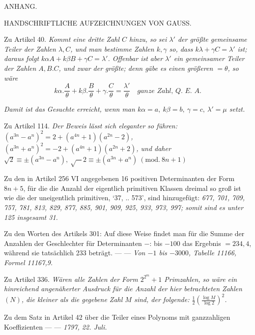
\begin{center}ANHANG.\end{center}

\begin{center}\small HANDSCHRIFTLICHE AUFZEICHNUNGEN VON GAUSS.\end{center}


Zu Artikel 40. \textit{Kommt eine dritte Zahl \(C\) hinzu, so sei \(\lambda'\) der größte gemeinsame Teiler der Zahlen \(\lambda,C\), und man bestimme Zahlen \(k,\gamma\) so, dass \(k\lambda+\gamma C=\lambda'\) ist; daraus folgt \(k\alpha A+k\beta B+\gamma C=\lambda'\). Offenbar ist aber \(\lambda'\) ein gemeinsamer Teiler der Zahlen \(A,B.C\), und zwar der größte; denn gäbe es einen größeren \(=\theta\), so wäre \[k\alpha.\frac{A}{\theta}+k\beta.\frac{B}{\theta}+\gamma.\frac{C}{\theta}=\frac{\lambda'}{\theta}\quad\textit{ganze Zahl, Q. E. A.}\]}


\textit{Damit ist das Gesuchte erreicht, wenn man \(k\alpha=a,\ k\beta=b,\ \gamma=c,\ \lambda'=\mu\) setzt.}


Zu Artikel 114. \textit{Der Beweis lässt sich eleganter so führen: \((a^{3n}-a^n)^2=2+(a^{4n}+1)(a^{2n}-2)\), \((a^{3n}+a^n)^2=-2+(a^{4n}+1)(a^{2n}+2)\), und daher \(\surd2\equiv\pm(a^{3n}-a^n),\ \surd-2\equiv\pm(a^{3n}+a^n)\ (\mathrm{mod.}\ 8n+1)\)}


Zu den in Artikel 256 VI angegebenen 16 positiven Determinanten der Form \(8n+5\), für die die Anzahl der eigentlich primitiven Klassen dreimal so groß ist wie die der uneigentlich primitiven, ‘37, .. 573’, sind hinzugefügt: \textit{677, 701, 709, 757, 781, 813, 829, 877, 885, 901, 909, 925, 933, 973, 997; somit sind es unter 125 insgesamt 31.}


Zu den Worten des Artikels 301: Auf diese Weise findet man für die Summe der Anzahlen der Geschlechter für Determinanten \(-\): bis \(-100\) das Ergebnis \(=234,4\), während sie tatsächlich 233 beträgt. — — \textit{Von \(-1\) bis \(-3000\), Tabelle 11166, Formel 11167,9.}


Zu Artikel 336. \textit{Wären alle Zahlen der Form \(2^{2^m}+1\) Primzahlen, so wäre ein hinreichend angenäherter Ausdruck für die Anzahl der hier betrachteten Zahlen \((N)\), die kleiner als die gegebene Zahl \(M\) sind, der folgende: \(\frac12\left(\frac{\log M}{\log2}\right)^2\).}


Zu dem Satz in Artikel 42 über die Teiler eines Polynoms mit ganzzahligen Koeffizienten — — \textit{1797, 22. Juli.}


